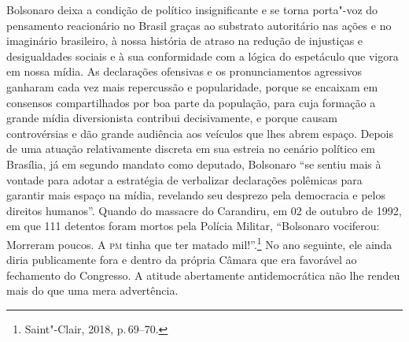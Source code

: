 Bolsonaro deixa a condição de político insignificante e se torna
porta"-voz do pensamento reacionário no Brasil graças ao substrato
autoritário nas ações e no imaginário brasileiro, à nossa história de
atraso na redução de injustiças e desigualdades sociais e à sua
conformidade com a lógica do espetáculo que vigora em nossa mídia. As
declarações ofensivas e os pronunciamentos agressivos ganharam cada vez
mais repercussão e popularidade, porque se encaixam em consensos
compartilhados por boa parte da população, para cuja formação a grande
mídia diversionista contribui decisivamente, e porque causam
controvérsias e dão grande audiência aos veículos que lhes abrem espaço.
Depois de uma atuação relativamente discreta em sua estreia no cenário
político em Brasília, já em segundo mandato como deputado, Bolsonaro
``se sentiu mais à vontade para adotar a estratégia de verbalizar
declarações polêmicas para garantir mais espaço na mídia, revelando seu
desprezo pela democracia e pelos direitos humanos''. Quando do massacre
do Carandiru, em 02 de outubro de 1992, em que 111 detentos foram mortos
pela Polícia Militar, ``Bolsonaro vociferou: Morreram poucos. A \textsc{pm} tinha
que ter matado mil!''.\footnote{Saint"-Clair, 2018, p.\,69--70.} No ano
seguinte, ele ainda diria publicamente fora e dentro da própria Câmara
que era favorável ao fechamento do Congresso. A atitude abertamente
antidemocrática não lhe rendeu mais do que uma mera advertência.


